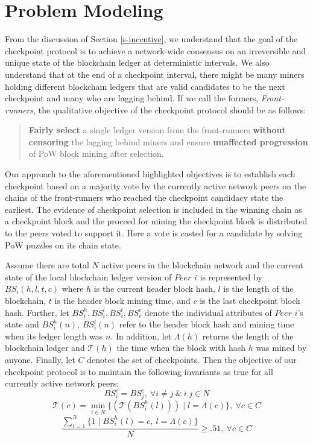 
\section{Problem Modeling}
\label{s-model}
From the discussion of Section \ref{s-incentive}, we understand that the goal of the checkpoint protocol is to achieve a network-wide consensus on an irreversible and unique state of the blockchain ledger at deterministic intervals. We also understand that at the end of a checkpoint interval, there might be many miners holding different blockchain ledgers that are valid candidates to be the next checkpoint and many who are lagging behind. If we call the formers, \textit{Front-runners}, the qualitative objective of the checkpoint protocol should be as follows:

\begin{quote}
\textbf{Fairly select} a single ledger version from the front-runners \textbf{without censoring} the lagging behind miners and ensure \textbf{unaffected progression} of PoW block mining after selection.  
\end{quote}

Our approach to the aforementioned highlighted objectives is to establish each checkpoint based on a majority vote by the currently active network peers on the chains of the front-runners who reached the checkpoint candidacy state the earliest. The evidence of checkpoint selection is included in the winning chain as a checkpoint block and the proceed for mining the checkpoint block is distributed to the peers voted to support it. Here a vote is casted for a candidate by solving PoW puzzles on its chain state.

Assume there are total $N$ active peers in the blockchain network and the current state of the local blockchain ledger version of $Peer$ $i$ is represented by $BS_i(h, l, t, c)$ where $h$ is the current header block hash, $l$ is the length of the blockchain, $t$ is the header block mining time, and $c$ is the last checkpoint block hash. Further, let $BS_i^h, BS_i^l, BS_i^t, BS_i^c$ denote the individual attributes of $Peer$ $i$'s state and $BS_i^h(n)$, $BS_i^t(n)$ refer to the header block hash and mining time when its ledger length was $n$. In addition, let $\Lambda(h)$ returns the length of the blockchain ledger and $\mathcal{T}(h)$ the time when the block with hash $h$ was mined by anyone. Finally, let $C$ denotes the set of checkpoints. Then the objective of our checkpoint protocol is to maintain the following invariants as true for all currently active network peers:
\begin{equation}
\label{e-1}
BS_i^c = BS_j^c,\ \forall i \neq j\ \&\ i.j \in N
\end{equation}
\begin{equation}
\label{e-2}
\mathcal{T}(c) = \min_{i \in N}\{(\mathcal{T}(BS_i^h(l))) \mid l = \Lambda(c)\},\ \forall c \in C  
\end{equation}
\begin{equation}
\label{e-3}
\frac{\sum_{i = 1}^N{\{1 \mid BS_i^h(l) = c,\ l = \Lambda(c)}\}}{N} \geq .51,\ \forall c \in C  
\end{equation}

